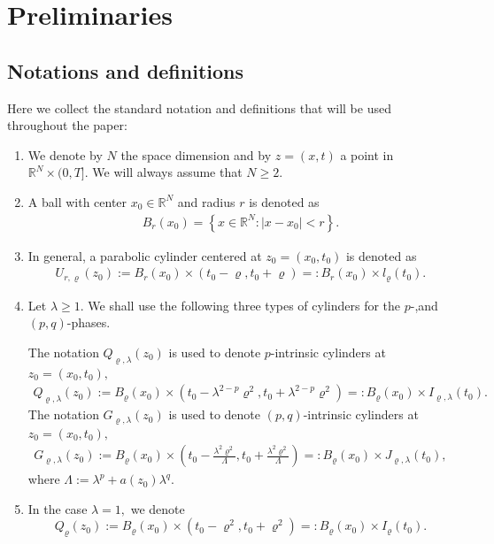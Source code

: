 \documentclass[notitlepage,11pt,reqno]{amsart}
\theoremstyle{definition}
\numberwithin{equation}{section}
\newcommand{\la}{\lambda}
\newcommand{\RR}{\mathds{R}}
\begin{document}
 \section{Preliminaries}
 \subsection{Notations and definitions}\label{notations and definitions} Here we collect the standard notation and definitions  that will be used throughout the paper:
\begin{enumerate}[label=(\roman*),series=theoremconditions]
\item \label{not1} We denote by $N$ the space dimension and by $z=(x,t)$ a point in $ \RR^N\times (0,T]$. We will always assume that $N \geq 2$.   
\item\label{not2} A ball with center $x_0 \in \RR^N$ and radius $r$ is denoted as
 \begin{align*}
     B_r(x_0)=\left\{x \in \RR^N : |x-x_0|<r\right\}.
 \end{align*}
\item\label{general cylinder} In general, a parabolic cylinder centered at $z_0=(x_0, t_0)$ is denoted as 
\begin{align*}
    U_{r, \varrho}(z_0):=B_r(x_0)\times \left(t_0-\varrho, t_0+\varrho\right)=:B_r(x_0)\times l_{\varrho}(t_0).
\end{align*}

\item\label{not5} Let $\lambda\geq 1.$ We shall use the following three types of cylinders for the $p$-,and $(p, q)$-phases. 

\noindent The notation $Q_{\varrho, \lambda}(z_0)$ is used to denote $p$-intrinsic cylinders at $z_0=(x_0, t_0),$
\begin{align*}
Q_{\varrho, \lambda}(z_0):=B_{\varrho}(x_0)\times \left(t_0-\lambda^{2-p}\varrho^2, t_0+\lambda^{2-p}\varrho^2\right)
=:B_{\varrho}(x_0)\times I_{\varrho, \lambda}(t_0).
\end{align*}
The notation $G_{\varrho, \lambda}(z_0)$ is used to denote $(p,q)$-intrinsic cylinders at $z_0=(x_0, t_0),$
\begin{align*}
G_{\varrho, \lambda}(z_0):=B_{\varrho}(x_0)\times \left(t_0-\frac{\lambda^{2}\varrho^2}{\Lambda}, t_0+\frac{\lambda^{2}\varrho^2}{\Lambda}\right)
=:B_{\varrho}(x_0)\times J_{\varrho, \lambda}(t_0),
\end{align*}
where $\Lambda:=\lambda^p+a(z_0)\lambda^q.$
\item \label{not5.5} In the case $\la =1,$ we denote 
\[
Q_\varrho(z_0) := B_{\varrho}(x_0) \times (t_0 - \varrho^2,t_0+\varrho^2) =: B_\varrho(x_0) \times I_\varrho(t_0).
\]



\end{enumerate}
\end{document}
